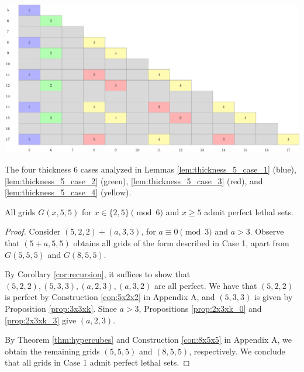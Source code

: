 \begin{table}[]
\centering
\includegraphics[width=\textwidth]{tables/4/thickness_5_cases.pdf}
\caption{The four thickness 6 cases analyzed in Lemmas \ref{lem:thickness_5_case_1} (blue), \ref{lem:thickness_5_case_2} (green), \ref{lem:thickness_5_case_3} (red), and \ref{lem:thickness_5_case_4} (yellow).}
\label{fig:thickness_5_cases}
\end{table}


\begin{lem}
\label{lem:thickness_5_case_1}
All grids $G(x,5,5)$ for $x \in \{2,5\} \pmod 6$ and $x \geq 5$ admit perfect lethal sets.
\end{lem}

\begin{proof}
Consider $(5,2,2) + (a,3,3)$, for $a \equiv 0 \pmod 3$ and $a >3$. Observe that $(5+a,5,5)$ obtains all grids of the form described in Case 1, apart from $G(5,5,5)$ and $G(8,5,5)$.

By Corollary \ref{cor:recursion}, it suffices to show that $(5,2,2), (5,3,3), (a,2,3), (a,3,2)$ are all perfect. We have that $(5,2,2)$ is perfect by Construction \ref{con:5x2x2} in Appendix A, and $(5,3,3)$ is given by Proposition \ref{prop:3x3xk}. Since $a >3$, Propositions \ref{prop:2x3xk_0} and \ref{prop:2x3xk_3} give $(a,2,3)$. 

By Theorem \ref{thm:hypercubes} and Construction \ref{con:8x5x5} in Appendix A, we obtain the remaining grids $(5,5,5)$ and $(8,5,5)$, respectively. We conclude that all grids in Case 1 admit perfect lethal sets.
\end{proof}

